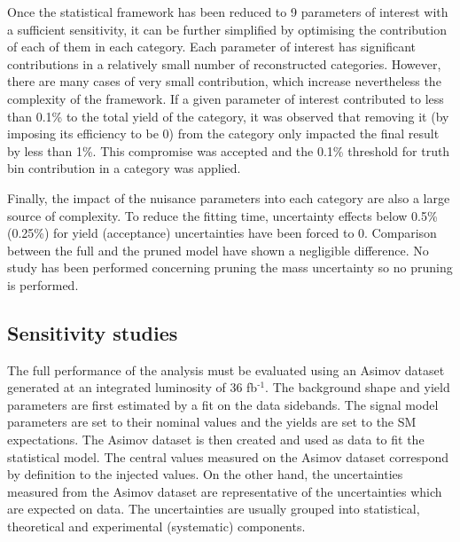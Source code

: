 Once the statistical framework has been reduced to 9 parameters of interest with a sufficient sensitivity, it can be further simplified by optimising the contribution of each of them in each category.
Each parameter of interest has significant contributions in a relatively small number of reconstructed categories.
However, there are many cases of very small contribution, which increase nevertheless the complexity of the framework.
If a given parameter of interest contributed to less than 0.1\% to the total yield of the category, it was observed that removing it (by imposing its efficiency to be 0) from the category only impacted the final result by less than 1\%.
This compromise was accepted and the 0.1\% threshold for truth bin contribution in a category was applied.

Finally, the impact of the nuisance parameters into each category are also a large source of complexity.
To reduce the fitting time, uncertainty effects below 0.5\% (0.25\%) for yield (acceptance) uncertainties have been forced to 0.
Comparison between the full and the pruned model have shown a negligible difference.
No study has been performed concerning pruning the mass uncertainty so no pruning is performed.

\subsection{Sensitivity studies}
\label{sec:orga35a118}

The full performance of the analysis must be evaluated using an Asimov dataset generated at an integrated luminosity of 36 fb\(^{\text{-1}}\).
The background shape and yield parameters are first estimated by a fit on the data sidebands.
The signal model parameters are set to their nominal values and the yields are set to the SM expectations.
The Asimov dataset is then created and used as data to fit the statistical model.
The central values measured on the Asimov dataset correspond by definition to the injected values.
On the other hand, the uncertainties measured from the Asimov dataset are representative of the uncertainties which are expected on data.
The uncertainties are usually grouped into statistical, theoretical and experimental (systematic) components.

